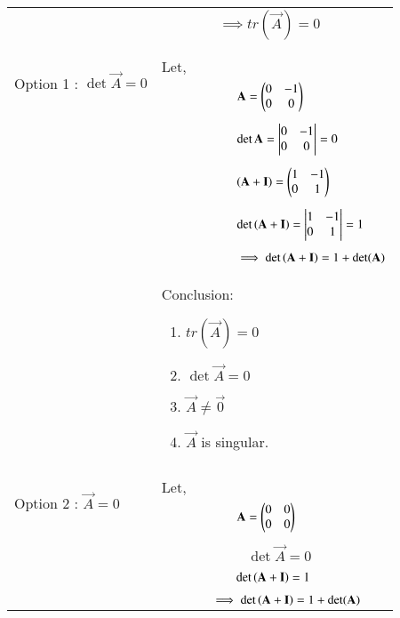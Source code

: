 \documentclass[journal,12pt]{IEEEtran}
\begin{document}
\begin{longtable}{|p{5cm}|p{13cm}|}
    &$\qquad\qquad\implies\boxed{ tr(\vec{A})=0}$\\
    &\\
    \hline
  	\multirow{3}{*}{Option 1 : $\det\vec{A}=0$ } 
	& \\
	& Let,\\
	& $\qquad\qquad\qquad\mathbf{A}=\begin{pmatrix}0&-1\\0&0\end{pmatrix}$\\
	&\\
	& $\qquad\qquad\qquad\det{\mathbf{A}} = \begin{vmatrix}0&-1\\0&0\end{vmatrix} = 0$\\
	&\\
	& $\qquad\qquad\qquad\left(\mathbf{A}+\mathbf{I}\right)=\begin{pmatrix}1&-1\\0&1\end{pmatrix}$\\
	&\\
	& $\qquad\qquad\qquad\det\left(\mathbf{A}+\mathbf{I}\right)=\begin{vmatrix}1&-1\\0&1\end{vmatrix}=1$\\
	&\\
	& $\qquad\qquad\qquad\implies\det\left(\mathbf{A}+\mathbf{I}\right)=1+\det(\mathbf{A
	})$\\
	& Conclusion: {\begin{enumerate}
	\item $tr(\vec{A})=0$
	\item $\det{\vec{A}}= 0$
	\item $\vec{A} \neq \vec{0}$
	\item $\vec{A}$ is  singular.\end{enumerate}}\\
	\hline
	\multirow{3}{*}{Option 2 : $\vec{A}=0$} & \\
	& Let,\\
	& $\qquad\qquad\qquad\mathbf{A}= \begin{pmatrix}0&0\\0&0\end{pmatrix}$\\
	&\\
    & $\qquad\qquad\qquad\det\vec{A}=0$\\
    &\\
    & $\qquad\qquad\qquad\det\left(\mathbf{A}+\mathbf{I}\right)=1$\\
    &\\
    & $\qquad\qquad\implies\det\left(\mathbf{A}+\mathbf{I}\right)=1+\det(\mathbf{A}) $\\
    
    \hline
   

\end{longtable}
\end{document}

